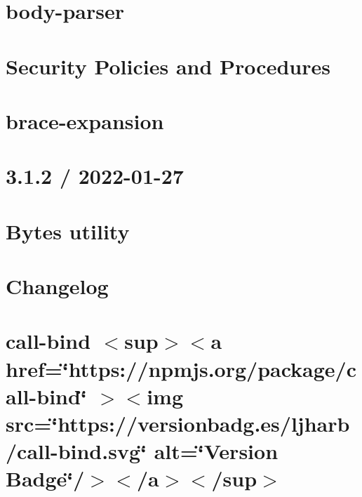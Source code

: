 \documentclass[twoside]{book}
\newcommand{\+}{\discretionary{\mbox{\scriptsize$\hookleftarrow$}}{}{}}
\begin{document}
\chapter{body-\/parser}
\label{md_Backend_nodejs_node_modules_body_parser_README}

\chapter{Security Policies and Procedures}
\label{md_Backend_nodejs_node_modules_body_parser_SECURITY}

\chapter{brace-\/expansion}
\label{md_Backend_nodejs_node_modules_brace_expansion_README}

\chapter{3.1.2 / 2022-\/01-\/27}
\label{md_Backend_nodejs_node_modules_bytes_History}

\chapter{Bytes utility}
\label{md_Backend_nodejs_node_modules_bytes_Readme}

\chapter{Changelog}
\label{md_Backend_nodejs_node_modules_call_bind_CHANGELOG}

\chapter{call-\/bind \texorpdfstring{$<$}{<}sup\texorpdfstring{$>$}{>}\texorpdfstring{$<$}{<}a href=\char`\"{}https\+://npmjs.\+org/package/call-\/bind\char`\"{} \texorpdfstring{$>$}{>}\texorpdfstring{$<$}{<}img src=\char`\"{}https\+://versionbadg.\+es/ljharb/call-\/bind.\+svg\char`\"{} alt=\char`\"{}\+Version Badge\char`\"{}/\texorpdfstring{$>$}{>}\texorpdfstring{$<$}{<}/a\texorpdfstring{$>$}{>}\texorpdfstring{$<$}{<}/sup\texorpdfstring{$>$}{>}}
\label{md_Backend_nodejs_node_modules_call_bind_README}

\end{document}
